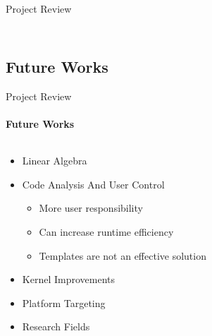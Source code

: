 \begin{frame}[t]{Project Review}
\begin{columns}[T]
\begin{column}{.48\textwidth}
\begin{figure}
      \end{figure}
    \end{column}
    \end{columns}
	\end{frame}

	\subsection{Future Works}
	\begin{frame}[t]{Project Review}\framesubtitle{Future Works}
	\begin{columns}[T]
	\begin{column}{0.48\textwidth}
		\begin{itemize}
			\item Linear Algebra
			\item Code Analysis And User Control
			\begin{itemize}
				\item More user responsibility
				\item Can increase runtime efficiency
				\item Templates are not an effective solution
			\end{itemize}
			\item Kernel Improvements
			\item Platform Targeting
			\item Research Fields
		\end{itemize}
	\end{column}
	\begin{column}{.48\textwidth}

\end{column}
\end{columns}
\end{frame}
